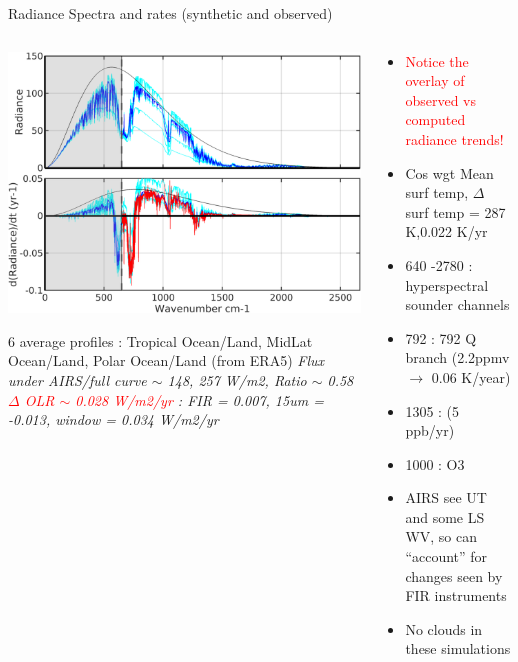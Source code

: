 \documentclass[10pt,t]{beamer}
\begin{document}
\begin{frame}{Radiance Spectra and rates (synthetic and observed)}

\vspace{-0.1in}
\begin{columns}

\begin{column}{0.55\columnwidth}
\begin{center}
\includegraphics[width=0.9\linewidth]{NEWFIGS/kcarta_0_3000__radtrends.png}
\end{center}
6 average profiles : Tropical Ocean/Land, MidLat Ocean/Land, Polar Ocean/Land (from ERA5) \newline
\small{\emph{Flux under AIRS/full curve $\sim$ 148, 257 W/m2, Ratio $\sim$ 0.58 \newline
\textcolor{red}{$\Delta$ OLR  $\sim$ 0.028 W/m2/yr} : FIR = 0.007, 15um = -0.013, window = 0.034 W/m2/yr}}
\end{column}


\begin{column}{0.55\columnwidth}
\begin{itemize}
  \item \textcolor{red}{Notice the overlay of observed vs computed radiance trends!}
  \item Cos wgt Mean surf temp, $\Delta$ surf temp = 287 K,0.022 K/yr
  \item 640 -2780 \wn : hyperspectral sounder channels
  \item 792 \wn : 792 \cd Q branch (2.2ppmv $\rightarrow$ 0.06 K/year)
  \item 1305 \wn : \methane (5 ppb/yr)
  \item 1000 \wn : O3
  \item AIRS see UT and some LS WV, so can ``account'' for changes seen by FIR instruments
  \item No clouds in these simulations
\end{itemize}
\end{column}
\end{columns}
\end{frame}
\end{document}
